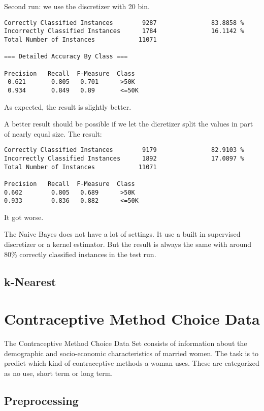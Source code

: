 \documentclass[paper=a4, fontsize=11pt]{scrartcl} %
\numberwithin{equation}{section} %
\numberwithin{figure}{section} %
\numberwithin{table}{section} %
\begin{document}
Second run: we use the discretizer with 20 bin.

\begin{verbatim}
Correctly Classified Instances        9287               83.8858 %
Incorrectly Classified Instances      1784               16.1142 %
Total Number of Instances            11071     

=== Detailed Accuracy By Class ===

Precision   Recall  F-Measure  Class
 0.621       0.805   0.701      >50K
 0.934       0.849   0.89       <=50K
\end{verbatim}

As expected, the result is slightly better.

A better result should be possible if we let the dicretizer split the values in part of nearly equal size. The result:

\begin{verbatim}
Correctly Classified Instances        9179               82.9103 %
Incorrectly Classified Instances      1892               17.0897 %
Total Number of Instances            11071     

Precision   Recall  F-Measure  Class
0.602        0.805   0.689      >50K
0.933        0.836   0.882      <=50K
\end{verbatim}

It got worse. 

The Naive Bayes does not have a lot of settings. It use a built in supervised discretizer or a kernel estimator. But the result is always the same with around 80\% correctly classified instances in the test run.

\subsection{k-Nearest}


\section{Contraceptive Method Choice Data}

The Contraceptive Method Choice Data Set consists of information about the demographic and socio-economic characteristics of married women. The task is to predict which kind of contraceptive methods a woman uses. These are categorized as no use, short term or long term.

\subsection{Preprocessing}
\end{document}
